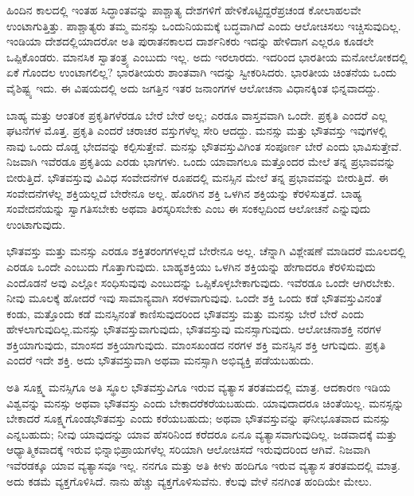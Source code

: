 \vskip 5pt

ಹಿಂದಿನ ಕಾಲದಲ್ಲಿ ಇಂತಹ ಸಿದ್ಧಾಂತವನ್ನು ಪಾಶ್ಚಾತ್ಯ ದೇಶಗಳಿಗೆ ಹೇಳಿಕೊಟ್ಟಿದ್ದರೆ\break ಪ್ರಚಂಡ ಕೋಲಾಹಲವೇ ಉಂಟಾಗುತ್ತಿತ್ತು. ಪಾಶ್ಚಾತ್ಯರು ತಮ್ಮ ಮನಸ್ಸು ಒಂದು\break ನಿಯಮಕ್ಕೆ ಬದ್ಧವಾಗಿದೆ ಎಂದು ಆಲೋಚಿಸಲು ಇಚ್ಚಿಸುವುದಿಲ್ಲ. ಇಂಡಿಯಾ ದೇಶದಲ್ಲಿ\-ಯಾದರೋ ಅತಿ ಪುರಾತನಕಾಲದ ದಾರ್ಶನಿಕರು ಇದನ್ನು ಹೇಳಿದಾಗ ಎಲ್ಲರೂ ಕೂಡಲೇ ಒಪ್ಪಿಕೊಂಡರು. ಮಾನಸಿಕ ಸ್ವಾತಂತ್ರ್ಯ ಎಂಬುದು ಇಲ್ಲ. ಅದು ಇರಲಾರದು. ಇದರಿಂದ ಭಾರತೀಯ ಮನೋಲೋಕದಲ್ಲಿ ಏಕೆ ಗೊಂದಲ ಉಂಟಾಗಲಿಲ್ಲ? ಭಾರತೀಯರು ಶಾಂತವಾಗಿ ಇದನ್ನು ಸ್ವೀಕರಿಸಿದರು. ಭಾರತೀಯ ಚಿಂತನೆಯ ಒಂದು ವೈಶಿಷ್ಟ್ಯ ಇದು. ಈ ವಿಷಯದಲ್ಲಿ ಅದು ಜಗತ್ತಿನ ಇತರ ಜನಾಂಗಗಳ ಆಲೋಚನಾ ವಿಧಾನಕ್ಕಿಂತ ಭಿನ್ನವಾದದ್ದು.

\vskip 5pt

ಬಾಹ್ಯ ಮತ್ತು ಆಂತರಿಕ ಪ್ರಕೃತಿಗಳೆರಡೂ ಬೇರೆ ಬೇರೆ ಅಲ್ಲ; ಎರಡೂ ವಾಸ್ತವವಾಗಿ ಒಂದೇ. ಪ್ರಕೃತಿ ಎಂದರೆ ಎಲ್ಲ ಘಟನೆಗಳ ಮೊತ್ತ. ಪ್ರಕೃತಿ ಎಂದರೆ ಚರಾಚರ ವಸ್ತುಗಳೆಲ್ಲ ಸೇರಿ ಆದದ್ದು. ಮನಸ್ಸು ಮತ್ತು ಭೌತವಸ್ತು ಇವುಗಳಲ್ಲಿ ನಾವು ಒಂದು ದೊಡ್ಡ ಭೇದವನ್ನು ಕಲ್ಪಿಸುತ್ತೇವೆ. ಮನಸ್ಸು ಭೌತವಸ್ತುವಿಗಿಂತ ಸಂಪೂರ್ಣ ಬೇರೆ ಎಂದು ಭಾವಿಸುತ್ತೇವೆ. ನಿಜವಾಗಿ ಇವೆರಡೂ ಪ್ರಕೃತಿಯ ಎರಡು ಭಾಗಗಳು. ಒಂದು ಯಾವಾಗಲೂ ಮತ್ತೊಂದರ ಮೇಲೆ ತನ್ನ ಪ್ರಭಾವವನ್ನು ಬೀರುತ್ತಿದೆ. ಭೌತವಸ್ತುವು ವಿವಿಧ ಸಂವೇದನೆಗಳ ರೂಪದಲ್ಲಿ ಮನಸ್ಸಿನ ಮೇಲೆ ತನ್ನ ಪ್ರಭಾವವನ್ನು ಬೀರುತ್ತಿದೆ. ಈ ಸಂವೇದನೆಗಳೆಲ್ಲ  ಶಕ್ತಿಯಲ್ಲದೆ ಬೇರೇನೂ ಅಲ್ಲ. ಹೊರಗಿನ ಶಕ್ತಿ ಒಳಗಿನ ಶಕ್ತಿಯನ್ನು ಕೆರಳಿಸುತ್ತದೆ. ಬಾಹ್ಯ ಸಂವೇದನೆಯನ್ನು ಸ್ವಾಗತಿಸಬೇಕು ಅಥವಾ ತಿರಸ್ಕರಿಸಬೇಕು ಎಂಬ ಈ ಸಂಕಲ್ಪದಿಂದ ಆಲೋಚನೆ ಎನ್ನುವುದು ಉಂಟಾಗುವುದು.

ಭೌತವಸ್ತು ಮತ್ತು ಮನಸ್ಸು ಎರಡೂ ಶಕ್ತಿತರಂಗಗಳಲ್ಲದೆ ಬೇರೇನೂ ಅಲ್ಲ. ಚೆನ್ನಾಗಿ ವಿಶ್ಲೇಷಣೆ ಮಾಡಿದರೆ ಮೂಲದಲ್ಲಿ ಎರಡೂ ಒಂದೇ ಎಂಬುದು ಗೊತ್ತಾಗುವುದು. ಬಾಹ್ಯಶಕ್ತಿಯು ಒಳಗಿನ ಶಕ್ತಿಯನ್ನು ಹೇಗಾದರೂ ಕೆರಳಿಸುವುದು ಎಂದೊಡನೆ ಅವು ಎಲ್ಲೋ ಸಂಧಿಸುವುವು ಎಂಬುದನ್ನು ಒಪ್ಪಿಕೊಳ್ಳಬೇಕಾಗುವುದು. ಇವೆರಡೂ ಒಂದೇ ಆಗಿರಬೇಕು. ನೀವು ಮೂಲಕ್ಕೆ ಹೋದರೆ ಇವು ಸಾಮಾನ್ಯವಾಗಿ ಸರಳವಾಗುವುವು. ಒಂದೇ ಶಕ್ತಿ ಒಂದು ಕಡೆ ಭೌತವಸ್ತುವಿನಂತೆ ಕಂಡು, ಮತ್ತೊಂದು ಕಡೆ ಮನಸ್ಸಿನಂತೆ ಕಾಣಿಸುವುದರಿಂದ ಭೌತವಸ್ತು ಮತ್ತು ಮನಸ್ಸು ಬೇರೆ ಬೇರೆ ಎಂದು ಹೇಳಲಾಗುವುದಿಲ್ಲ.\break ಮನಸ್ಸು ಭೌತವಸ್ತುವಾಗುವುದು, ಭೌತವಸ್ತುವು ಮನಸ್ಸಾಗುವುದು. ಆಲೋಚನಾಶಕ್ತಿ ನರಗಳ ಶಕ್ತಿಯಾಗುವುದು, ಮಾಂಸದ ಶಕ್ತಿಯಾಗುವುದು. ಮಾಂಸಖಂಡದ ನರಗಳ ಶಕ್ತಿ ಮನಸ್ಸಿನ ಶಕ್ತಿ ಆಗುವುದು. ಪ್ರಕೃತಿ ಎಂದರೆ ಇದೇ ಶಕ್ತಿ. ಅದು ಭೌತವಸ್ತುವಾಗಿ ಅಥವಾ ಮನಸ್ಸಾಗಿ ಅಭಿವ್ಯಕ್ತಿ ಪಡೆಯಬಹುದು.

ಅತಿ ಸೂಕ್ಷ್ಮ ಮನಸ್ಸಿಗೂ ಅತಿ ಸ್ಥೂಲ ಭೌತವಸ್ತುವಿಗೂ ಇರುವ ವ್ಯತ್ಯಾಸ ತರತಮದಲ್ಲಿ ಮಾತ್ರ. ಆದಕಾರಣ ಇಡಿಯ ವಿಶ್ವವನ್ನು ಮನಸ್ಸು ಅಥವಾ ಭೌತವಸ್ತು ಎಂದು ಬೇಕಾದರೆ\break ಕರೆಯಬಹುದು. ಯಾವುದಾದರೂ ಚಿಂತೆಯಿಲ್ಲ. ಮನಸ್ಸನ್ನು ಬೇಕಾದರೆ ಸೂಕ್ಷ್ಮಗೊಂಡ\break ಭೌತವಸ್ತು ಎಂದು ಕರೆಯಬಹುದು; ಅಥವಾ ಭೌತವಸ್ತುವನ್ನು ಘನೀಭೂತವಾದ ಮನಸ್ಸು ಎನ್ನಬಹುದು; ನೀವು ಯಾವುದನ್ನು ಯಾವ ಹೆಸರಿನಿಂದ ಕರೆದರೂ ಏನೂ ವ್ಯತ್ಯಾಸವಾಗು\-ವುದಿಲ್ಲ. ಜಡವಾದಕ್ಕೆ ಮತ್ತು ಆಧ್ಯಾತ್ಮಿಕವಾದಕ್ಕೆ ಇರುವ ಭಿನ್ನಾಭಿಪ್ರಾಯಗಳೆಲ್ಲ ಸರಿಯಾಗಿ ಆಲೋಚಿಸದೆ ಇರುವುದರಿಂದ ಆಗಿವೆ. ನಿಜವಾಗಿ ಇವೆರಡಕ್ಕೂ ಯಾವ ವ್ಯತ್ಯಾಸವೂ ಇಲ್ಲ. ನನಗೂ ಮತ್ತು ಅತಿ ಕೀಳು ಹಂದಿಗೂ ಇರುವ ವ್ಯತ್ಯಾಸ ತರತಮದಲ್ಲಿ ಮಾತ್ರ. ಅದು ಕಡಮೆ ವ್ಯಕ್ತಗೊಳಿಸಿದೆ. ನಾನು ಹೆಚ್ಚು ವ್ಯಕ್ತಗೊಳಿಸುವೆನು. ಕೆಲವು ವೇಳೆ ನನಗಿಂತ ಹಂದಿಯೇ ಮೇಲು.

